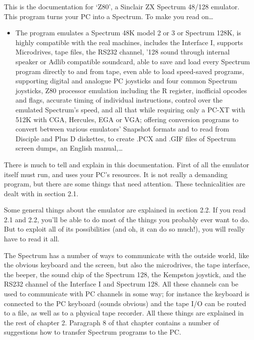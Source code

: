     This is the documentation for `Z80', a Sinclair ZX Spectrum 48/128
    emulator.  This program turns your PC into a Spectrum.  To make you
    read on\ldots
\begin{itemize} 
  \item[]
      The program emulates a Spectrum 48K model 2 or 3 or Spectrum 128K,
      is highly compatible with the real machines, includes the
      Interface I, supports Microdrives, tape files, the RS232 channel,
      '128 sound through internal speaker or Adlib compatible soundcard,
      able to save and load every Spectrum program directly to and from
      tape, even able to load speed-saved programs, supporting digital
      and analogue PC joysticks and four common Spectrum joysticks, Z80
      processor emulation including the R register, inofficial opcodes
      and flags, accurate timing of individual instructions, control
      over the emulated Spectrum's speed, and all that while requiring
      only a PC-XT with 512K with CGA, Hercules, EGA or VGA; offering
      conversion programs to convert between various emulators' Snapshot
      formats and to read from Disciple and Plus D diskettes, to create
      .PCX and .GIF files of Spectrum screen dumps, an English
      manual,\ldots
\end{itemize}

\noindent
    There is much to tell and explain in this documentation.  First of all
    the emulator itself must run, and uses your PC's resources.  It is not
    really a demanding program, but there are some things that need
    attention.  These technicalities are dealt with in section 2.1.

    Some general things about the emulator are explained in section 2.2. If
    you read 2.1 and 2.2, you'll be able to do most of the things you
    probably ever want to do.  But to exploit all of its possibilities (and
    oh, it can do so much!), you will really have to read it all.

    The Spectrum has a number of ways to communicate with the outside world,
    like the obvious keyboard and the screen, but also the microdrives, the
    tape interface, the beeper, the sound chip of the Spectrum 128, the
    Kempston joystick, and the RS232 channel of the Interface I and Spectrum
    128.  All these channels can be used to communicate with PC channels in
    some way; for instance the keyboard is connected to the PC keyboard
    (sounds obvious) and the tape I/O can be routed to a file, as well as to
    a physical tape recorder.  All these things are explained in the rest of
    chapter 2.  Paragraph 8 of that chapter contains a number of suggestions
    how to transfer Spectrum programs to the PC.

